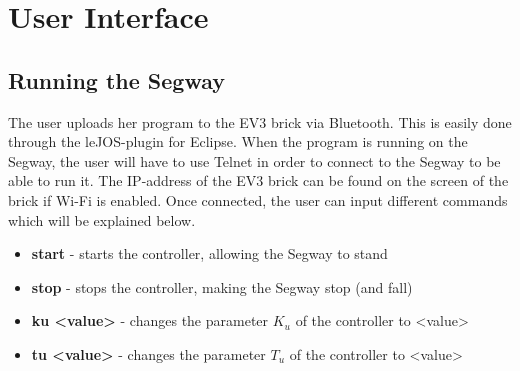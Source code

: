 


\section{User Interface}

\subsection{Running the Segway}
The user uploads her program to the EV3 brick via Bluetooth. This is easily done through the leJOS-plugin for Eclipse. When the program is running on the Segway, the user will have to use Telnet in order to connect to the Segway to be able to run it. The IP-address of the EV3 brick can be found on the screen of the brick if Wi-Fi is enabled. Once connected, the user can input different commands which will be explained below.

\begin{itemize}
\item \textbf{start} - starts the controller, allowing the Segway to stand
\item \textbf{stop} - stops the controller, making the Segway stop (and fall)
\item \textbf{ku <value>} - changes the parameter $K_{u}$ of the controller to <value>
\item \textbf{tu <value>} - changes the parameter $T_{u}$ of the controller to <value>
\end{itemize}

